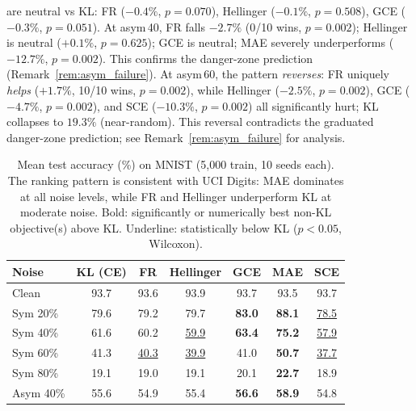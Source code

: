 \documentclass[11pt]{article}
\begin{document}
\begin{enumerate}
    are neutral vs KL: FR ($-0.4\%$, $p=0.070$), Hellinger ($-0.1\%$, $p=0.508$),
    GCE ($-0.3\%$, $p=0.051$).
    At asym\,40, FR falls $-2.7\%$ (0/10 wins, $p=0.002$); Hellinger is neutral
    ($+0.1\%$, $p=0.625$); GCE is neutral; MAE severely underperforms ($-12.7\%$, $p=0.002$).
    This confirms the danger-zone prediction (Remark~\ref{rem:asym_failure}).
    At asym\,60, the pattern \emph{reverses}: FR uniquely \emph{helps} ($+1.7\%$,
    10/10 wins, $p=0.002$), while Hellinger ($-2.5\%$, $p=0.002$), GCE ($-4.7\%$,
    $p=0.002$), and SCE ($-10.3\%$, $p=0.002$) all significantly hurt; KL collapses
    to $19.3\%$ (near-random).
    This reversal contradicts the graduated danger-zone prediction; see
    Remark~\ref{rem:asym_failure} for analysis.
\end{enumerate}

\begin{table}[t]
  \centering
  \caption{Mean test accuracy (\%) on MNIST (5,000 train, 10 seeds each).
    The ranking pattern is consistent with UCI Digits: MAE dominates at all
    noise levels, while FR and Hellinger underperform KL at moderate noise.
    Bold: significantly or numerically best non-KL objective(s) above KL.
    Underline: statistically below KL ($p<0.05$, Wilcoxon).}
  \label{tab:accuracy_mnist}
  \small
  \begin{tabular}{lcccccc}
    \toprule
    Noise & KL (CE) & FR & Hellinger & GCE & MAE & SCE \\
    \midrule
    Clean    & 93.7 & 93.6 & 93.9 & 93.7 & 93.5 & 93.7 \\
    Sym 20\% & 79.6 & 79.2 & 79.7 & \textbf{83.0} & \textbf{88.1} & \underline{78.5} \\
    Sym 40\% & 61.6 & 60.2 & \underline{59.9} & \textbf{63.4} & \textbf{75.2} & \underline{57.9} \\
    Sym 60\% & 41.3 & \underline{40.3} & \underline{39.9} & 41.0 & \textbf{50.7} & \underline{37.7} \\
    Sym 80\% & 19.1 & 19.0 & 19.1 & 20.1 & \textbf{22.7} & 18.9 \\
    Asym 40\% & 55.6 & 54.9 & 55.4 & \textbf{56.6} & \textbf{58.9} & 54.8 \\
    \bottomrule
  \end{tabular}
\end{table}
\end{document}
